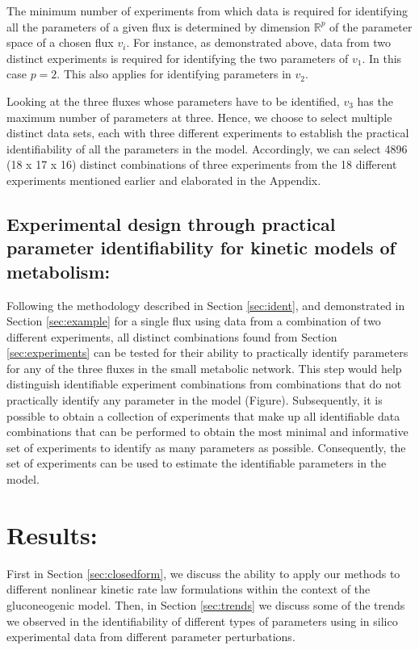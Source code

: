 \documentclass[10pt]{article}
\begin{document}
The minimum number of experiments from which data is required for identifying all the parameters of a given flux is determined by dimension $\mathbb{R}^p$ of the parameter space of a chosen flux $v_i$. For instance, as demonstrated above, data from two distinct experiments is required for identifying the two parameters of $v_1$. In this case $p=2$. This also applies for identifying parameters in $v_2$.

Looking at the three fluxes whose parameters have to be identified, $v_3$ has the maximum number of parameters at three. Hence, we choose to select multiple distinct data sets, each with three different experiments to establish the practical identifiability of all the parameters in the model. Accordingly, we can select 4896 (18 x 17 x 16) distinct combinations of three experiments from the 18 different experiments mentioned earlier and elaborated in the Appendix. 

\subsection{Experimental design through practical parameter identifiability for kinetic models of metabolism:}
Following the methodology described in Section \ref{sec:ident}, and demonstrated in Section \ref{sec:example} for a single flux using data from a combination of two different experiments, all distinct combinations found from Section \ref{sec:experiments} can be tested for their ability to practically identify parameters for any of the three fluxes in the small metabolic network. This step would help distinguish identifiable experiment combinations from combinations that do not practically identify any parameter in the model (Figure).
Subsequently, it is possible to obtain a collection of experiments that make up all identifiable data combinations that can be performed to obtain the most minimal and informative set of experiments to identify as many parameters as possible. Consequently, the set of experiments can be used to estimate the identifiable parameters in the model.

\section{Results:}
First in Section \ref{sec:closedform}, we discuss the ability to apply our methods to different nonlinear kinetic rate law formulations within the context of the gluconeogenic model. Then, in Section \ref{sec:trends} we discuss some of the trends we observed in the identifiability of different types of parameters using in silico experimental data from different parameter perturbations.%
\end{document}
